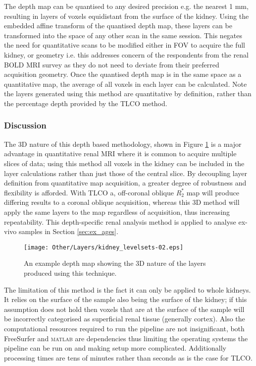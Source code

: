 The depth map can be quantised to any desired precision e.g. the nearest 1 mm, resulting in layers of voxels equidistant from the surface of the kidney. Using the embedded affine transform of the quantised depth map, these layers can be transformed into the space of any other scan in the same session. This negates the need for quantitative scans to be modified either in \ac{FOV} to acquire the full kidney, or geometry i.e. this addresses concern of the respondents from the renal \ac{BOLD} \ac{MRI} survey as they do not need to deviate from their preferred acquisition geometry. Once the quantised depth map is in the same space as a quantitative map, the average of all voxels in each layer can be calculated. Note the layers generated using this method are quantitative by definition, rather than the percentage depth provided by the \ac{TLCO} method.

\subsubsection{Discussion}
The 3D nature of this depth based methodology, shown in Figure \ref{fig:ex_layers_kidney} is a major advantage in quantitative renal \ac{MRI} where it is common to acquire multiple slices of data; using this method all voxels in the kidney can be included in the layer calculations rather than just those of the central slice. By decoupling layer definition from quantitative map acquisition, a greater degree of robustness and flexibility is afforded. With \ac{TLCO} a, off-coronal oblique $R_2^*$ map will produce differing results to a coronal oblique acquisition, whereas this 3D method will apply the same layers to the map regardless of acquisition, thus increasing repeatability. This depth-specific renal analysis method is applied to analyse ex-vivo samples in Section \ref{sec:ex_ages}.

\begin{figure}[H]
	\centering
	\texttt{[image: Other/Layers/kidney\_levelsets-02.eps]}
	\caption{An example depth map showing the 3D nature of the layers produced using this technique.}
	\label{fig:ex_layers_kidney}
\end{figure}

\newpage
The limitation of this method is the fact it can only be applied to whole kidneys. It relies on the surface of the sample also being the surface of the kidney; if this assumption does not hold then voxels that are at the surface of the sample will be incorrectly categorised as superficial renal tissue (generally cortex). Also the computational resources required to run the pipeline are not insignificant, both FreeSurfer and \textsc{matlab} are dependencies thus limiting the operating systems the pipeline can be run on and making setup more complicated. Additionally processing times are tens of minutes rather than seconds as is the case for \ac{TLCO}.

